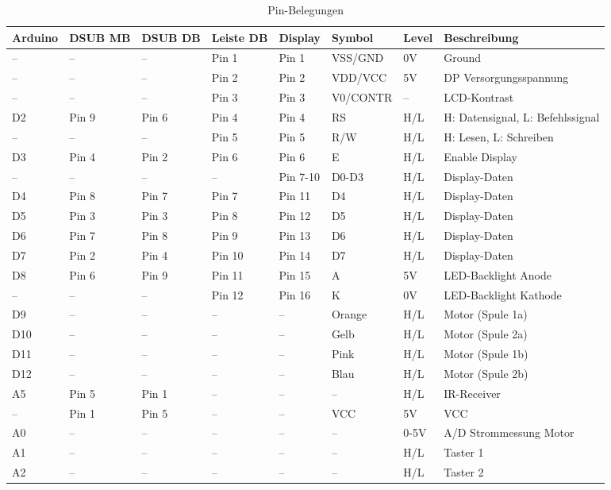 \documentclass[11pt, titlepage, fleqn]{report}
\begin{document}
			\begin{table}[htbp]
				\caption[Tabelle]{Pin-Belegungen}
				\label{tab:tabDisplay}
				\begin{tabular}{llllllll}
				\toprule
					\textbf{Arduino} & \textbf{DSUB MB} 	  & \textbf{DSUB DB} 	& \textbf{Leiste DB} 	& \textbf{Display}	 & \textbf{Symbol}   & \textbf{Level} & \textbf{Beschreibung}\\
				\midrule
					--		&--		 	  &--			& Pin 1				& Pin 1      & VSS/GND  & 0V    & Ground\\
					--		&--		  	  &--			& Pin 2				& Pin 2      & VDD/VCC  & 5V    & DP Versorgungsspannung\\
					--		&--		 	  &--			& Pin 3				& Pin 3      & V0/CONTR & --    & LCD-Kontrast\\
					D2		& Pin 9		  & Pin 6		& Pin 4				& Pin 4      & RS       & H/L   & H: Datensignal, L: Befehlssignal\\
					--		&--		  	  &--			& Pin 5				& Pin 5      & R/W      & H/L   & H: Lesen, L: Schreiben\\
					D3		& Pin 4		  & Pin 2		& Pin 6				& Pin 6      & E        & H/L   & Enable Display\\
					--		&--		 	  &--			& --				& Pin 7-10	 & D0-D3    & H/L   & Display-Daten\\
					D4		& Pin 8		  & Pin 7		& Pin 7				& Pin 11	 & D4       & H/L   & Display-Daten\\
					D5		& Pin 3		  & Pin 3		& Pin 8				& Pin 12     & D5       & H/L   & Display-Daten\\
					D6		& Pin 7		  & Pin 8		& Pin 9	    		& Pin 13     & D6       & H/L   & Display-Daten\\
					D7		& Pin 2		  & Pin 4		& Pin 10			& Pin 14     & D7       & H/L   & Display-Daten\\
					D8		& Pin 6		  & Pin 9		& Pin 11			& Pin 15     & A        & 5V    & LED-Backlight Anode\\
					--		&--		  	  &--			& Pin 12			& Pin 16     & K		& 0V    & LED-Backlight Kathode\\
					D9		&--		 	  &--			& --				& --     	 & Orange	& H/L   & Motor (Spule 1a)\\
					D10		&--		 	  &--			& --				& --     	 & Gelb		& H/L   & Motor (Spule 2a)\\
					D11		&--		 	  &--			& --				& --    	 & Pink		& H/L   & Motor (Spule 1b)\\
					D12		&--		 	  &--			& --				& --    	 & Blau		& H/L   & Motor (Spule 2b)\\
					A5		& Pin 5		  & Pin 1		& --				& --    	 & --		& H/L   & IR-Receiver\\
					--		& Pin 1		  & Pin 5		& --				& --    	 & VCC		& 5V    & VCC\\
					A0		& --		  &--			& --				& --    	 & --		& 0-5V  & A/D Strommessung Motor\\
					A1		& --		  &--			& --				& --    	 & --		& H/L   & Taster 1\\
					A2		& --		  &--			& --				& --    	 & --		& H/L   & Taster 2\\

				\end{tabular}
			\end{table}
			\newpage
\end{document}

